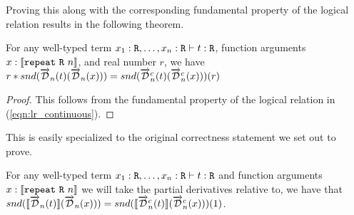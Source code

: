   Proving this along with the corresponding fundamental property of the logical relation results in the following theorem.
  \begin{theorem}
    For any well-typed term $x_1 : \texttt{R}, \dots, x_n : \texttt{R} \vdash t : \texttt{R}$, function arguments $x : \llbracket \texttt{repeat}\ \texttt{R}\ n \rrbracket$, and real number $r$, we have $r * snd(\overrightarrow{\mathcal{D}}_n(t)(\overrightarrow{\mathcal{D}}_n(x))) = snd(\overrightarrow{\mathcal{D}}^c_n(t)(\overrightarrow{\mathcal{D}}^c_n(x)))(r)$
  \end{theorem}
  \begin{proof}
    This follows from the fundamental property of the logical relation in (\cref{eqn:lr_continuous}).
  \end{proof}

  This is easily specialized to the original correctness statement we set out to prove.

  \begin{corollary}
    For any well-typed term $x_1 : \synR, \dots, \linebreak x_n : \synR \vdash t : \synR$ and function arguments $x : \llbracket \texttt{repeat}\ \texttt{R}\ n \rrbracket$ we will take the partial derivatives relative to, we have that $snd(\llbracket\overrightarrow{\mathcal{D}}_n(t)\rrbracket (\overrightarrow{\mathcal{D}}_n(x))) = snd(\llbracket\overrightarrow{\mathcal{D}}^c_n(t)\rrbracket (\overrightarrow{\mathcal{D}}^c_n(x)))(1)$.
  \end{corollary}
